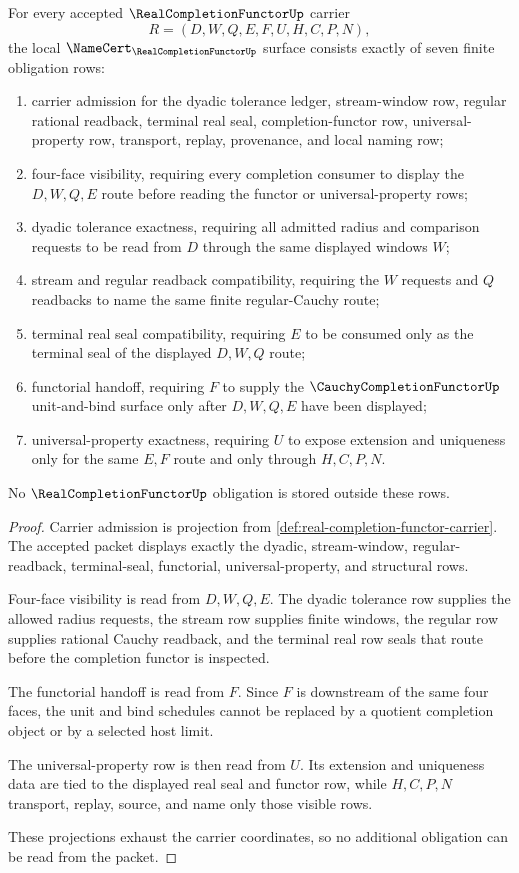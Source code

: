\begin{theorem}
\label{thm:real-completion-functor-namecert-obligations}
For every accepted $\RealCompletionFunctorUp$ carrier
$$
R=(D,W,Q,E,F,U,H,C,P,N),
$$
the local $\NameCert_{\RealCompletionFunctorUp}$ surface consists exactly of seven finite obligation rows:
\begin{enumerate}
\item carrier admission for the dyadic tolerance ledger, stream-window row, regular rational readback, terminal real seal, completion-functor row, universal-property row, transport, replay, provenance, and local naming row;
\item four-face visibility, requiring every completion consumer to display the $D,W,Q,E$ route before reading the functor or universal-property rows;
\item dyadic tolerance exactness, requiring all admitted radius and comparison requests to be read from $D$ through the same displayed windows $W$;
\item stream and regular readback compatibility, requiring the $W$ requests and $Q$ readbacks to name the same finite regular-Cauchy route;
\item terminal real seal compatibility, requiring $E$ to be consumed only as the terminal seal of the displayed $D,W,Q$ route;
\item functorial handoff, requiring $F$ to supply the $\CauchyCompletionFunctorUp$ unit-and-bind surface only after $D,W,Q,E$ have been displayed;
\item universal-property exactness, requiring $U$ to expose extension and uniqueness only for the same $E,F$ route and only through $H,C,P,N$.
\end{enumerate}
No $\RealCompletionFunctorUp$ obligation is stored outside these rows.
\end{theorem}
\begin{proof}
Carrier admission is projection from \autoref{def:real-completion-functor-carrier}. The accepted packet displays exactly the dyadic, stream-window, regular-readback, terminal-seal, functorial, universal-property, and structural rows.

Four-face visibility is read from $D,W,Q,E$. The dyadic tolerance row supplies the allowed radius requests, the stream row supplies finite windows, the regular row supplies rational Cauchy readback, and the terminal real row seals that route before the completion functor is inspected.

The functorial handoff is read from $F$. Since $F$ is downstream of the same four faces, the unit and bind schedules cannot be replaced by a quotient completion object or by a selected host limit.

The universal-property row is then read from $U$. Its extension and uniqueness data are tied to the displayed real seal and functor row, while $H,C,P,N$ transport, replay, source, and name only those visible rows.

These projections exhaust the carrier coordinates, so no additional obligation can be read from the packet.
\end{proof}

